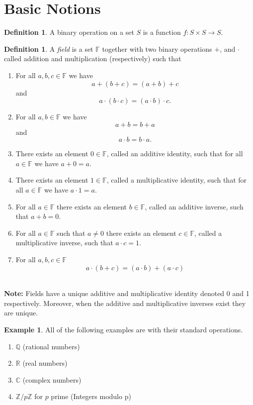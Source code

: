 \documentclass[12pt,letterpaper]{article}
\theoremstyle{plain}
\theoremstyle{definition}
\newtheorem{definition}[theorem]{Definition}
\newtheorem{example}[theorem]{Example}
\numberwithin{equation}{section}
\begin{document}
\onehalfspacing
\tableofcontents
{}

\section{Basic Notions}
\begin{definition} A binary operation on a set $S$ is a function $f:S\times S\rightarrow S$. 
\end{definition}
\begin{definition} A \emph{field} is a set $\mathbb{F}$ together with two binary operations $+$, and $\cdot$ called addition and multiplication (respectively) such that 
\ \\
\begin{enumerate}[1.]
\setlength{\itemsep}{5pt}
\item For all $a,b,c\in \mathbb{F}$ we have 
\[a+(b+c)=(a+b)+c\]
and 
\[a\cdot(b\cdot c)=(a\cdot b)\cdot c.\]
\item For all $a,b\in \mathbb{F}$ we have 
\[a+b=b+a\]
and 
\[a\cdot b=b\cdot a.\]
\item There exists an element $0\in \mathbb{F}$, called an additive identity,  such that for all $a\in \mathbb{F}$ we have $a+0=a$. 
\item There exists an element $1\in \mathbb{F}$, called a multiplicative identity, such that for all $a\in \mathbb{F}$ we have $a\cdot 1=a$.
\item For all $a\in \mathbb{F}$ there exists an element $b\in \mathbb{F}$, called an additive inverse, such that $a+b=0.$ 
\item For all $a\in \mathbb{F}$ such that $a\neq 0$ there exists an element $c\in \mathbb{F}$, called a multiplicative inverse, such that $a\cdot c=1$.
\item  For all $a,b,c\in \mathbb{F}$ 
\[a\cdot (b+c)=(a\cdot b)+ (a\cdot c)\]

\end{enumerate}
\end{definition}
\ \\
{\bf \noindent Note:} Fields have a unique additive and multiplicative identity denoted 0 and 1 respectively. Moreover, when the additive and multiplicative inverses exist they are unique.\\

\begin{example}
 All of the following examples are with their standard operations. 
\begin{enumerate}[1.]
\setlength{\itemsep}{5pt}
\item $\mathbb{Q}$ (rational numbers)
\item $\mathbb{R}$ (real numbers)
\item $\mathbb{C}$ (complex numbers)
\item $\mathbb{Z}/p\mathbb{Z}$ for $p$ prime (Integers modulo p)
\end{enumerate}
\end{example}
\end{document}
